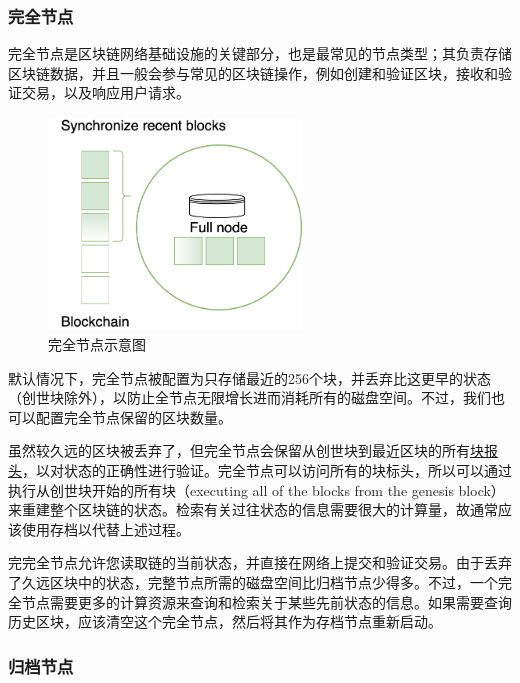 \hypertarget{ux5b8cux5168ux8282ux70b9}{%
\subsubsection{完全节点}\label{ux5b8cux5168ux8282ux70b9}}

完全节点是区块链网络基础设施的关键部分，也是最常见的节点类型；其负责存储区块链数据，并且一般会参与常见的区块链操作，例如创建和验证区块，接收和验证交易，以及响应用户请求。

\begin{figure}[htbp]
  \centering
  \includegraphics[width=0.6\textwidth]{images/full-node.png}
  \caption{完全节点示意图}\label{完全节点示意图} %
\end{figure}

默认情况下，完全节点被配置为只存储最近的256个块，并丢弃比这更早的状态（创世块除外），以防止全节点无限增长进而消耗所有的磁盘空间。不过，我们也可以配置完全节点保留的区块数量。

虽然较久远的区块被丢弃了，但完全节点会保留从创世块到最近区块的所有\href{/reference/glossary/\#header}{块报头}，以对状态的正确性进行验证。完全节点可以访问所有的块标头，所以可以通过执行从创世块开始的所有块（executing
all of the blocks from the genesis
block）来重建整个区块链的状态。检索有关过往状态的信息需要很大的计算量，故通常应该使用存档以代替上述过程。

完完全节点允许您读取链的当前状态，并直接在网络上提交和验证交易。由于丢弃了久远区块中的状态，完整节点所需的磁盘空间比归档节点少得多。不过，一个完全节点需要更多的计算资源来查询和检索关于某些先前状态的信息。如果需要查询历史区块，应该清空这个完全节点，然后将其作为存档节点重新启动。

\hypertarget{ux5f52ux6863ux8282ux70b9}{%
\subsubsection{归档节点}\label{ux5f52ux6863ux8282ux70b9}}

